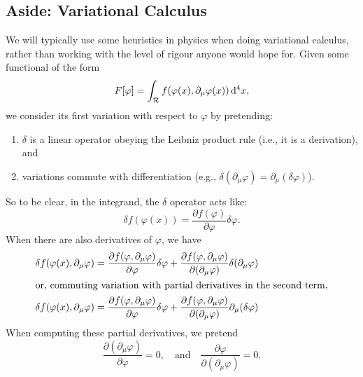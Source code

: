\subsection{Aside: Variational Calculus}

\M
We will typically use some heuristics in physics when doing variational
calculus, rather than working with the level of rigour anyone would hope
for. Given some functional of the form
\begin{equation}
F[\varphi] = \int_{\mathcal{R}}f(\varphi(x), \partial_{\mu}\varphi(x))\,\mathrm{d}^{4}x,
\end{equation}
we consider its first variation with respect to $\varphi$ by pretending:
\begin{enumerate}
\item $\delta$ is a linear operator obeying the Leibniz product rule (i.e., it
is a derivation), and
\item variations commute with differentiation (e.g., $\delta(\partial_{\mu}\varphi)=\partial_{\mu}(\delta\varphi)$).
\end{enumerate}
So to be clear, in the integrand, the $\delta$ operator acts like:
\begin{equation}
\delta f(\varphi(x)) 
= \frac{\partial f(\varphi)}{\partial\varphi}\delta\varphi.
\end{equation}
When there are also derivatives of $\varphi$, we have
\begin{subequations}
\begin{align}
\delta f(\varphi(x),\partial_{\mu}\varphi) 
&= \frac{\partial f(\varphi,\partial_{\mu}\varphi)}{\partial\varphi}\delta\varphi
+ \frac{\partial f(\varphi,\partial_{\mu}\varphi)}{\partial(\partial_{\mu}\varphi)}\delta(\partial_{\mu}\varphi)\\
\intertext{or, commuting variation with partial derivatives in the second term,}
\delta f(\varphi(x),\partial_{\mu}\varphi) &= \frac{\partial f(\varphi,\partial_{\mu}\varphi)}{\partial\varphi}\delta\varphi
+ \frac{\partial f(\varphi,\partial_{\mu}\varphi)}{\partial(\partial_{\mu}\varphi)}\partial_{\mu}(\delta\varphi)
\end{align}
\end{subequations}
When computing these partial derivatives, we pretend
\begin{equation}
\frac{\partial(\partial_{\mu}\varphi)}{\partial\varphi}
=0,\quad\mbox{and}\quad
\frac{\partial\varphi}{\partial(\partial_{\mu}\varphi)}=0.
\end{equation}

